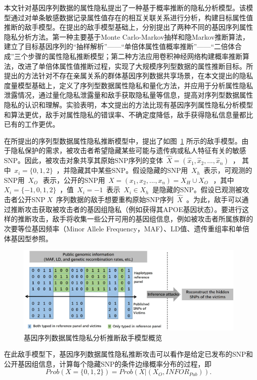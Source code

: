 \documentclass[pdftex,notypeinfo,twoside,openany,UTF8,fntef]{CASthesis}
\theoremstyle{THrm}{
	\newtheorem{question}{Question}[section]
	\newtheorem{property}{性质}[section]
	\newtheorem{assumption}{假设}[section]
	\newtheorem{claim}[lemma]{断言}
	
}
\begin{document}
本文针对基因序列数据的属性隐私提出了一种基于概率推断的隐私分析模型。该模型通过对单条敏感数据记录属性值存在的相互关联关系进行分析，构建目标属性值推断的敌手模型。在提出的敌手模型基础上，分别提出了两种不同的基因序列属性隐私分析方法。第一种主要基于Monte Carlo-Markov抽样和隐Markov推断算法，建立了目标基因序列的“抽样解析”——“单倍体属性值概率推断”——“二倍体合成”三个步骤的属性隐私推断模型；第二种方法应用卷积神经网络构建概率推断算法，改进了单倍体属性值推断过程，实现了大规模序列型数据的属性推断目标。所提出的方法针对不存在亲属关系的群体基因序列数据共享场景，在本文提出的隐私度量模型基础上，定义了序列型数据属性隐私和量化方法，并应用于分析属性隐私泄露情况，通过量化隐私泄露量和敌手获取隐私量等信息，提高对序列型数据属性隐私的认识和理解。实验表明，本文提出的方法比现有基因序列属性隐私分析模型和算法更优，敌手对属性隐私的错误率、不确定度降低，敌手获得隐私信息量都比已有的工作更优。

在所提出的序列型数据属性隐私推断模型中，提出了如图~\ref{fig:adversary-model} 所示的敌手模型。由于隐私保护的需求，被攻击者希望隐藏某些可能与遗传病或私人特征有关的敏感SNP。因此，被攻击对象共享其原始SNP序列的变体~$\hat{X}=(\hat{x}_1,\hat{x}_2, ... , \hat{x}_n)$~， 其中~$\hat{x}_i =\{0,1,2\}$~，并隐藏其中某些SNP。假设隐藏的SNP用~$X_h$~表示，可观测的SNP用~$X_O~$~表示，公开的SNP用~$X=(x_1, x_2, ..., x_n)=X_H \cup X_O~$~，其中~$X_i =\{-1,0,1,2\}$~，值~$X_i=-1$~表示~$X_i\in X_h$~是隐藏的SNP。假设已观测被攻击者公开SNP$~X$~序列数据的敌手想要重构原始SNP序列~$\hat{X}$~。为此，敌手可以通过推断攻击获取被攻击者的基因组隐私（例如获得其APOE基因状态）。要进行这样的推断攻击，敌手将收集一些公开可用的基因组信息，例如被攻击者所属族群的次要等位基因频率（Minor Allele Frequency，MAF）、LD值、遗传重组率和单倍体基因型参照。

\begin{figure}[htbp]
	\centering
	\includegraphics[width = 0.95\linewidth]{./figures/Fig2-adversary-model}
	\caption{基因序列数据属性隐私分析推断敌手模型概览}
	\label{fig:adversary-model}
\end{figure}

在此敌手模型下，基因序列数据属性隐私推断攻击可以看作是给定已发布的SNP和公开基因组信息，计算每个隐藏SNP的条件边缘概率分布的过程，即
\begin{equation}
Prob(X=\{0,1,2\})=Prob(X|(X_O,{INFOR}_{Pub})).
\end{equation}
\end{document}
